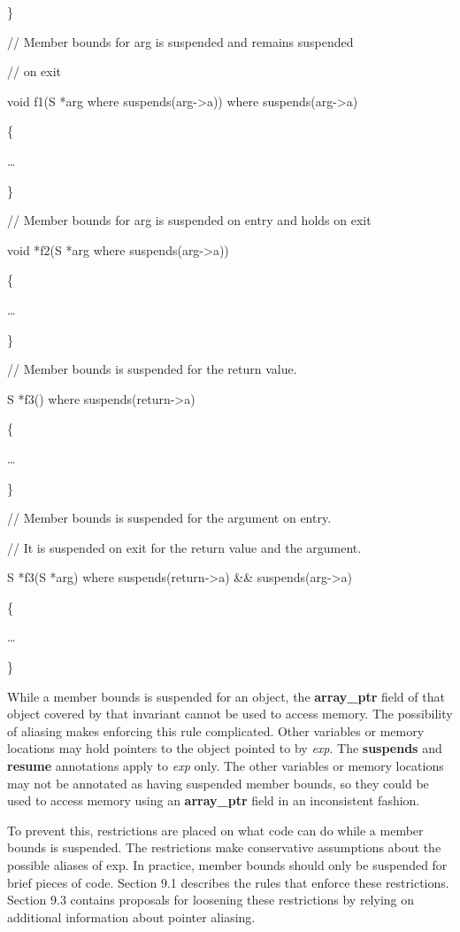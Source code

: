 \documentclass[]{article}
\begin{document}
\}

// Member bounds for arg is suspended and remains suspended

// on exit

void f1(S *arg where suspends(arg-\textgreater{}a)) where
suspends(arg-\textgreater{}a)

\{

\ldots{}

\}

// Member bounds for arg is suspended on entry and holds on exit

void *f2(S *arg where suspends(arg-\textgreater{}a))

\{

\ldots{}

\}

// Member bounds is suspended for the return value.

S *f3() where suspends(return-\textgreater{}a)

\{

\ldots{}

\}

// Member bounds is suspended for the argument on entry.

// It is suspended on exit for the return value and the argument.

S *f3(S *arg) where suspends(return-\textgreater{}a) \&\&
suspends(arg-\textgreater{}a)

\{

\ldots{}

\}

While a member bounds is suspended for an object, the
\textbf{array\_ptr} field of that object covered by that invariant
cannot be used to access memory. The possibility of aliasing makes
enforcing this rule complicated. Other variables or memory locations may
hold pointers to the object pointed to by \emph{exp}. The
\textbf{suspends} and \textbf{resume} annotations apply to \emph{exp}
only. The other variables or memory locations may not be annotated as
having suspended member bounds, so they could be used to access memory
using an \textbf{array\_ptr} field in an inconsistent fashion.

To prevent this, restrictions are placed on what code can do while a
member bounds is suspended. The restrictions make conservative
assumptions about the possible aliases of exp. In practice, member
bounds should only be suspended for brief pieces of code. Section 9.1
describes the rules that enforce these restrictions. Section 9.3
contains proposals for loosening these restrictions by relying on
additional information about pointer aliasing.
\end{document}
